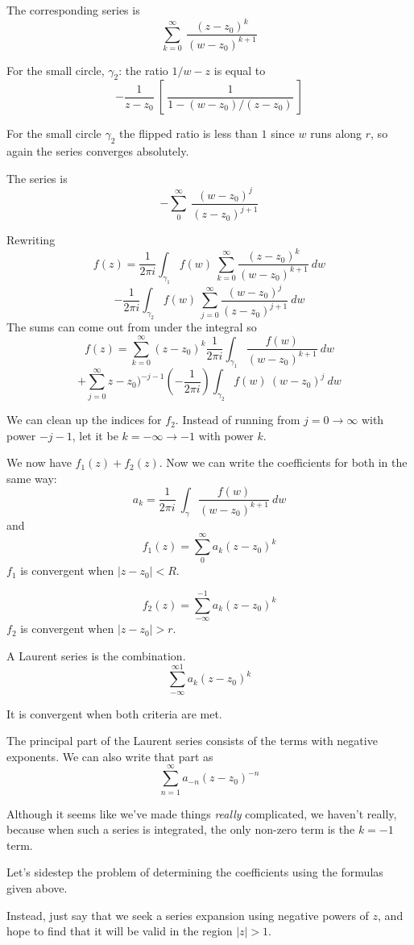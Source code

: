 \documentclass[11pt, oneside]{article}
\begin{document}
The corresponding series is
\[ \sum_{k=0}^{\infty} \ \frac{(z - z_0)^k}{(w - z_0)^{k+1}} \]

For the small circle, $\gamma_2$:
the ratio $1/w-z$ is equal to
\[ -\frac{1}{z - z_0} \ [ \ \frac{1}{1 - (w-z_0)/(z-z_0)} \ ] \]

For the small circle $\gamma_2$ the flipped ratio is less than $1$ since $w$ runs along $r$, so again the series converges absolutely.  

The series is
\[ - \sum_0^{\infty} \ \frac{(w - z_0)^j}{(z - z_0)^{j+1}} \]

Rewriting 
\[ f(z) = \frac{1}{2 \pi i} \int_{\gamma_1} f(w) \ \sum_{k=0}^{\infty} \frac{(z - z_0)^k}{(w - z_0)^{k+1}} \ dw \]
\[ -  \frac{1}{2 \pi i} \int_{\gamma_2} f(w) \ \sum_{j=0}^{\infty} \frac{(w - z_0)^j}{(z - z_0)^{j+1}} \ dw \]
The sums can come out from under the integral so
\[ f(z) = \sum_{k=0}^{\infty} (z - z_0)^k \frac{1}{2 \pi i} \int_{\gamma_1} \frac{f(w)}{(w - z_0)^{k+1}} \ dw \]
\[ + \sum_{j=0}^{\infty} z - z_0)^{-j-1} (- \frac{1}{2 \pi i}) \int_{\gamma_2} f(w) \ (w - z_0)^{j}  \ dw \]

We can clean up the indices for $f_2$.  Instead of running from $j = 0 \rightarrow \infty$ with power $ - j -1$, let it be $k = - \infty \rightarrow -1$ with power $k$.

We now have $f_1(z) + f_2(z)$.  Now we can write the coefficients for both in the same way:
\[ a_k = \frac{1}{2 \pi i} \ \int_{\gamma} \frac{f(w)}{(w - z_0)^{k+1}} \ dw \]
and
\[ f_1(z) = \sum_0^{\infty} a_k(z-z_0)^k \]
$f_1$ is convergent when $|z-z_0| < R$.

\[ f_2(z) = \sum_{-\infty}^{-1} a_k(z-z_0)^k \]
$f_2$ is convergent when $|z-z_0| > r$.

A Laurent series is the combination.
\[ \sum_{-\infty}^{\infty1} a_k(z-z_0)^k \]

It is convergent when both criteria are met.

The principal part of the Laurent series consists of the terms with negative exponents.  We can also write that part as
\[ \sum_{n=1}^{\infty} a_{-n} (z - z_0)^{-n} \]

Although it seems like we've made things \emph{really} complicated, we haven't really, because when such a series is integrated, the only non-zero term is the $k = -1$ term.

Let's sidestep the problem of determining the coefficients using the formulas given above.

Instead, just say that we seek a series expansion using negative powers of $z$, and hope to find that it will be valid in the region $|z| > 1$.
\end{document}
